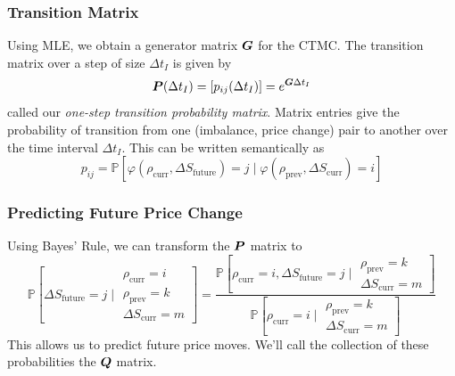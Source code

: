 \begin{frame}
\frametitle{Transition Matrix}
Using MLE, we obtain a generator matrix $\boldsymbol{G}$ for the CTMC. The transition matrix over a step of size $\Delta t_I$ is given by
\[ \boldsymbol{P}(\Delta t_I) = [p_{ij}(\Delta t_I)] = e^{\boldsymbol{G} \Delta t_I} \]
called our \emph{one-step transition probability matrix}. Matrix entries give the probability of transition from one (imbalance, price change) pair to another over the time interval $\Delta t_I$. This can be written semantically as
\[ p_{ij} = \mathbb{P}\left[ \varphi( \rho_\text{curr}, \Delta S_\text{future}) = j \; | \; \varphi( \rho_\text{prev}, \Delta S_\text{curr} ) = i \right] \]
\end{frame}

\begin{frame}
\frametitle{Predicting Future Price Change}
Using Bayes' Rule, we can transform the $\boldsymbol{P}$ matrix to 
\[ \mathbb{P}\left[ \Delta S_\text{future} = j \; | \; \substack{
\rho_\text{curr} = i \\
\rho_\text{prev} = k\\
\Delta S_\text{curr} = m} \right] = \dfrac{\mathbb{P}\left[ \rho_\text{curr} = i, \Delta S_\text{future} = j \; | \; \substack{
\rho_\text{prev} = k\\
\Delta S_\text{curr} = m} \right]}{\mathbb{P}\left[ \rho_\text{curr} = i \; | \; \substack{
\rho_\text{prev} = k\\
\Delta S_\text{curr} = m} \right]} \]
This allows us to predict future price moves.
\vspace{\baselineskip}
We'll call the collection of these probabilities the $\boldsymbol{Q}$ matrix.
\end{frame}

